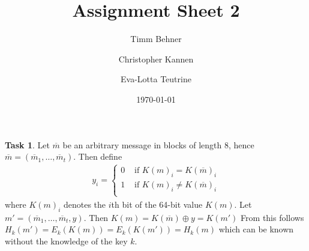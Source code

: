 \documentclass{scrartcl}
\title{Assignment Sheet 2}
\author{Timm Behner \and Christopher Kannen \and Eva-Lotta Teutrine}
\date{\today}
\theoremstyle{definition}
\newtheorem{exercise}{Task}
\begin{document}
\maketitle
\setcounter{exercise}{2}
\begin{exercise}
    Let $\overline m$ be an arbitrary message in blocks of length 8, hence
    $\overline m = \left( \overline m_1, \dots , \overline m_t \right)$. Then define
    \begin{align}
        y_i = \begin{cases}
            0 & \text{ if } K(m)_i = K(\overline m)_i \\
            1 & \text{ if } K(m)_i \neq K(\overline m)_i \\
        \end{cases}
    \end{align}
    where $K(m)_i$ denotes the $i$th bit of the 64-bit value $K(m)$. Let $m' =
    \left( \overline m_1, \dots , \overline m_t, y \right)$.
    Then $K(m) = K(\overline m) \oplus y = K(m')$ 
    From this follows $H_k(m') = E_k(K(m)) = E_k(K(m')) = H_k(m)$ which can be
    known without the knowledge of the key $k$.
\end{exercise}
\end{document}
